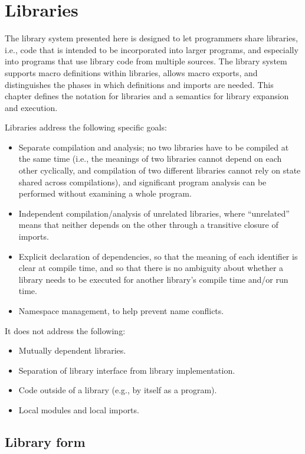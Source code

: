 \chapter{Libraries}
\label{librarychapter}
The library system presented here is designed to let programmers share
libraries, i.e., code that is intended to be incorporated into larger
programs, and especially into programs that use library code from multiple
sources.  The library system supports macro definitions within libraries,
allows macro exports, and distinguishes the phases in which definitions
and imports are needed.  This chapter defines the notation for
libraries and a semantics for library expansion and execution.

Libraries address the following specific goals:

\begin{itemize}
\item Separate compilation and analysis; no two libraries have to be
  compiled at the same time (i.e., the meanings of two libraries
  cannot depend on each other cyclically, and compilation of two
  different libraries cannot rely on state shared across
  compilations), and significant program analysis
  can be performed without examining a whole program.
\item Independent compilation/analysis of unrelated libraries, where
  ``unrelated'' means that neither depends on the other through a
  transitive closure of imports.
\item Explicit declaration of dependencies, so that the meaning of
  each identifier is clear at compile time, and so that there is no
  ambiguity about whether a library needs to be executed for another
  library's compile time and/or run time.
\item Namespace management, to help prevent name conflicts.
\end{itemize}

It does not address the following:

\begin{itemize}
\item Mutually dependent libraries.
\item Separation of library interface from library implementation.
\item Code outside of a library (e.g., {} by itself as a program).
\item Local modules and local imports. 
\end{itemize}

\section{Library form}
\label{librarysyntaxsection}

